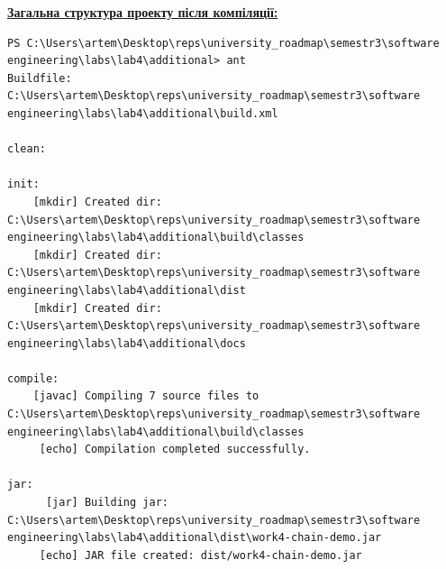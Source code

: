 \documentclass[12pt,a4paper]{article}
\begin{document}
    \textbf{\underline{Загальна структура проекту після компіляції:}}

    \begin{verbatim}
PS C:\Users\artem\Desktop\reps\university_roadmap\semestr3\software engineering\labs\lab4\additional> ant
Buildfile: C:\Users\artem\Desktop\reps\university_roadmap\semestr3\software engineering\labs\lab4\additional\build.xml

clean:

init:
    [mkdir] Created dir: C:\Users\artem\Desktop\reps\university_roadmap\semestr3\software engineering\labs\lab4\additional\build\classes
    [mkdir] Created dir: C:\Users\artem\Desktop\reps\university_roadmap\semestr3\software engineering\labs\lab4\additional\dist
    [mkdir] Created dir: C:\Users\artem\Desktop\reps\university_roadmap\semestr3\software engineering\labs\lab4\additional\docs

compile:
    [javac] Compiling 7 source files to C:\Users\artem\Desktop\reps\university_roadmap\semestr3\software engineering\labs\lab4\additional\build\classes
     [echo] Compilation completed successfully.

jar:
      [jar] Building jar: C:\Users\artem\Desktop\reps\university_roadmap\semestr3\software engineering\labs\lab4\additional\dist\work4-chain-demo.jar
     [echo] JAR file created: dist/work4-chain-demo.jar


\end{verbatim}
\end{document}
